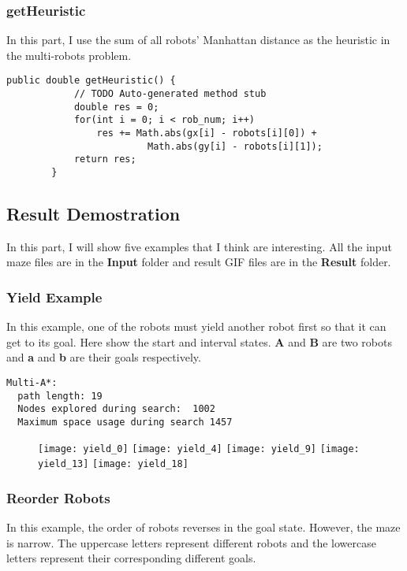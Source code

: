 \documentclass{article}
\begin{document}
\subsubsection{getHeuristic}
In this part, I use the sum of all robots' Manhattan distance as the heuristic in the multi-robots problem.
\begin{lstlisting}
public double getHeuristic() {
			// TODO Auto-generated method stub
			double res = 0;
			for(int i = 0; i < rob_num; i++)
				res += Math.abs(gx[i] - robots[i][0]) +
						 Math.abs(gy[i] - robots[i][1]);
			return res;
		}
\end{lstlisting}

\subsection{Result Demostration}
In this part, I will show five examples that I think are interesting. All the input maze files are in the \textbf{Input} folder and result GIF files are in the \textbf{Result} folder.

\subsubsection{Yield Example}
In this example, one of the robots must yield another robot first so that it can get to its goal. Here show the start and interval states. \textbf{A} and \textbf{B} are two robots and \textbf{a} and \textbf{b} are their goals respectively.

\begin{lstlisting}
Multi-A*:  
  path length: 19
  Nodes explored during search:  1002
  Maximum space usage during search 1457
\end{lstlisting}

\begin{figure}[!htb]

  \texttt{[image: yield\_0]}
\endminipage\hfill
{}
  \texttt{[image: yield\_4]}
\endminipage\hfill
{}
  \texttt{[image: yield\_9]}
\endminipage
{}
  \texttt{[image: yield\_13]}
\endminipage
{}
  \texttt{[image: yield\_18]}
\endminipage
\end{figure}

\clearpage
\subsubsection{Reorder Robots}
In this example, the order of robots reverses in the goal state. However, the maze is narrow. The uppercase letters represent different robots and the lowercase letters represent their corresponding different goals.
\end{document}

